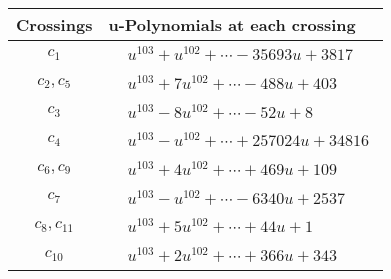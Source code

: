 \documentclass[1p]{elsarticle_modified}
\theoremstyle{definition}
\begin{document}
\begin{tabular}{m{50pt}|m{274pt}}
Crossings & \hspace{64pt}u-Polynomials at each crossing \\
\hline $$\begin{aligned}c_{1}\end{aligned}$$&$\begin{aligned}
&u^{103}+u^{102}+\cdots-35693 u+3817
\end{aligned}$\\
\hline $$\begin{aligned}c_{2},c_{5}\end{aligned}$$&$\begin{aligned}
&u^{103}+7 u^{102}+\cdots-488 u+403
\end{aligned}$\\
\hline $$\begin{aligned}c_{3}\end{aligned}$$&$\begin{aligned}
&u^{103}-8 u^{102}+\cdots-52 u+8
\end{aligned}$\\
\hline $$\begin{aligned}c_{4}\end{aligned}$$&$\begin{aligned}
&u^{103}- u^{102}+\cdots+257024 u+34816
\end{aligned}$\\
\hline $$\begin{aligned}c_{6},c_{9}\end{aligned}$$&$\begin{aligned}
&u^{103}+4 u^{102}+\cdots+469 u+109
\end{aligned}$\\
\hline $$\begin{aligned}c_{7}\end{aligned}$$&$\begin{aligned}
&u^{103}- u^{102}+\cdots-6340 u+2537
\end{aligned}$\\
\hline $$\begin{aligned}c_{8},c_{11}\end{aligned}$$&$\begin{aligned}
&u^{103}+5 u^{102}+\cdots+44 u+1
\end{aligned}$\\
\hline $$\begin{aligned}c_{10}\end{aligned}$$&$\begin{aligned}
&u^{103}+2 u^{102}+\cdots+366 u+343
\end{aligned}$\\
\hline
\end{tabular}\\~\\
\end{document}
